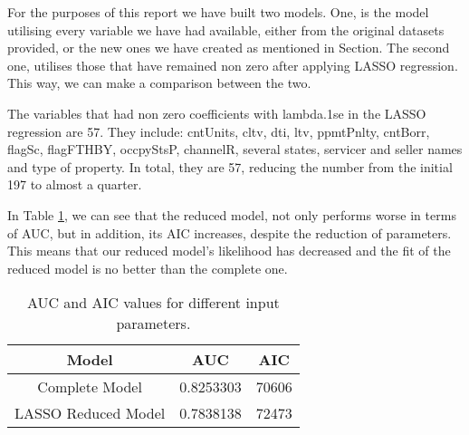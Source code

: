 For the purposes of this report we have built two models. One, is the model utilising every variable we have had available, either from the original datasets provided, or the new ones we have created as mentioned in Section. The second one, utilises those that have remained non zero after applying LASSO regression. This way, we can make a comparison between the two.

The variables that had non zero coefficients with lambda.1se in the LASSO regression are 57. They include: cntUnits, cltv, dti, ltv, ppmtPnlty, cntBorr, flagSc, flagFTHBY, occpyStsP, channelR, several states, servicer and seller names and type of property. In total, they are 57, reducing the number from the initial 197 to almost a quarter. 

In Table \ref{ModelAICandAUC}, we can see that the reduced model, not only performs worse in terms of AUC, but in addition, its AIC increases, despite the reduction of parameters. This means that our reduced model's likelihood has decreased and the fit of the reduced model is no better than the complete one.
    


    \begin{table}[H]
        \centering
            \begin{tabular}{c|c|c}
            Model & AUC & AIC \\\hline
            Complete Model & 0.8253303 & 70606\\
            LASSO Reduced Model &  0.7838138 & 72473\\
            
		    \end{tabular}
            \caption{AUC and AIC values for different input parameters.}
	        \label{ModelAICandAUC}
    \end{table}

